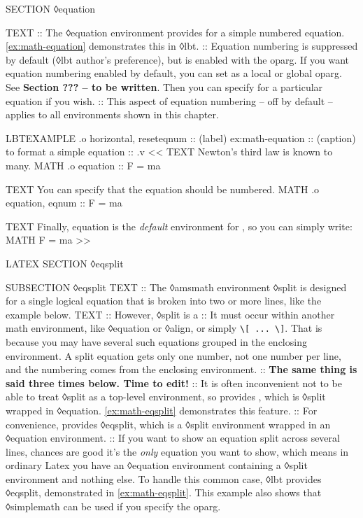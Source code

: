 \begin{lbt}
    SECTION ◊equation

    TEXT
    :: The ◊equation environment provides for a simple numbered equation. \cref{ex:math-equation} demonstrates this in ◊lbt.
    :: Equation numbering is suppressed by default (◊lbt author's preference), but is enabled with the  oparg. If you want equation numbering enabled by default, you can set  as a local or global oparg. See \textbf{Section ??? -- to be written}. Then you can specify  for a particular equation if you wish.
    :: This aspect of equation numbering -- off by default -- applies to all environments shown in this chapter.

    LBTEXAMPLE .o horizontal, reseteqnum
    :: (label) ex:math-equation
    :: (caption)  to format a simple equation
    :: .v <<
      TEXT Newton's third law is known to many.
      MATH .o equation :: F = ma

      TEXT You can specify that the equation should be numbered.
      MATH .o equation, eqnum :: F = ma

      TEXT Finally, equation is the \emph{default} environment for , so you can simply write:
      MATH F = ma
    >>

    LATEX \FloatBarrier
    SECTION ◊eqsplit

    SUBSECTION ◊eqsplit
    TEXT
    :: The ◊amsmath environment ◊split is designed for a single logical equation that is broken into two or more lines, like the example below.
    TEXT
    :: However, ◊split is a
    :: It must occur within another math environment, like ◊equation or ◊align, or simply \Verb|\[ ... \]|. That is because you may have several such equations grouped in the enclosing environment. A split equation gets only one number, not one number per line, and the numbering comes from the enclosing environment.
    :: \textbf{The same thing is said three times below. Time to edit!}
    :: It is often inconvenient not to be able to treat ◊split as a top-level environment, so  provides , which is ◊split wrapped in ◊equation. \cref{ex:math-eqsplit} demonstrates this feature.
    :: For convenience,  provides ◊eqsplit, which is a ◊split environment wrapped in an ◊equation environment.
    :: If you want to show an equation split across several lines, chances are good it's the \emph{only} equation you want to show, which means in ordinary Latex you have an ◊equation environment containing a ◊split environment and nothing else. To handle this common case, ◊lbt provides ◊eqsplit, demonstrated in \cref{ex:math-eqsplit}. This example also shows that ◊simplemath can be used if you specify the  oparg.


\end{lbt}
